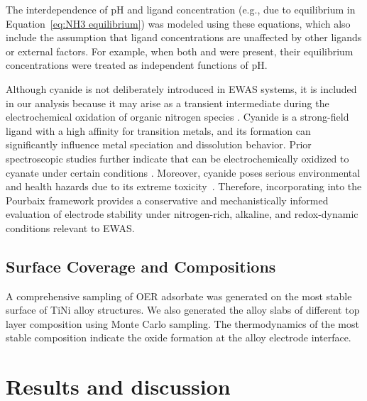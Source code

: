 \documentclass[journal=jacsat,manuscript=article]{achemso}
\begin{document}
The interdependence of pH and ligand concentration (e.g., due to  equilibrium in Equation~\eqref{eq:NH3 equilibrium}) was modeled using these equations, which also include the assumption that ligand concentrations are unaffected by other ligands or external factors. For example, when both  and  were present, their equilibrium concentrations were treated as independent functions of pH.


Although cyanide is not deliberately introduced in EWAS systems, it is included in our analysis because it may arise as a transient intermediate during the electrochemical oxidation of organic nitrogen species \cite{Oraby2020GoldPermanganate, Chen2013AdsorptionStudy, Huerta1997ElectrochemicalPt111, Sandoval2011AdsorptionStudy}. Cyanide is a strong-field ligand with a high affinity for transition metals, and its formation can significantly influence metal speciation and dissolution behavior. Prior spectroscopic studies further indicate that  can be electrochemically oxidized to cyanate under certain conditions \cite{Paulissen1992InfraredConditions, Hinman1986FourierElectrodes, Kitamura1986OxidationSpectroscopy, Chen2013AdsorptionStudy}. Moreover, cyanide poses serious environmental and health hazards due to its extreme toxicity~\cite{xing2018simple, mekuto2016integrated, bruger2018volatilisation}. Therefore, incorporating  into the Pourbaix framework provides a conservative and mechanistically informed evaluation of electrode stability under nitrogen-rich, alkaline, and redox-dynamic conditions relevant to EWAS.



\subsection{Surface Coverage and Compositions}

A comprehensive sampling of OER adsorbate was generated on the most stable surface of TiNi alloy structures. We also generated the alloy slabs of different top layer composition using Monte Carlo sampling. The thermodynamics of the most stable composition indicate the oxide formation at the alloy electrode interface. 



\section{Results and discussion}
\end{document}
